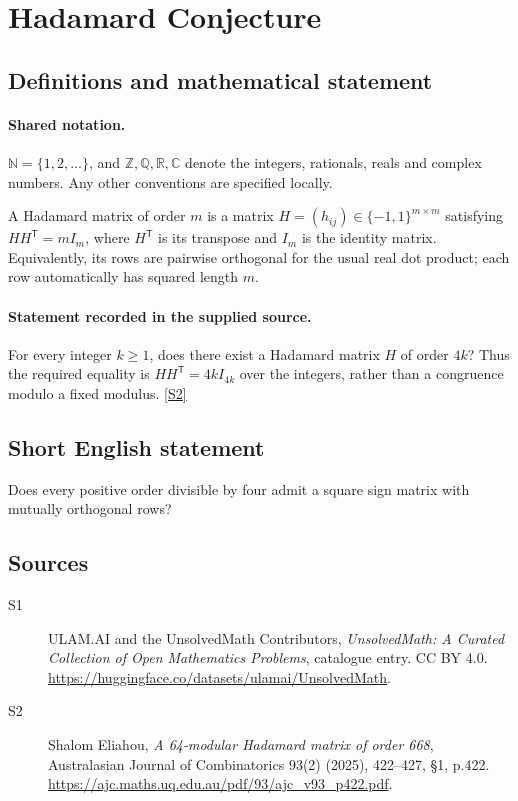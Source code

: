\documentclass[11pt]{article}
\newcommand{\sref}[2]{\hyperlink{source:#1:#2}{[S#2]}}
\begin{document}
\section{Hadamard Conjecture}\label{statement}

\subsection{Definitions and mathematical statement}

\paragraph{Shared notation.}$\mathbb N=\{1,2,\ldots\}$, and $\mathbb Z,\mathbb Q,\mathbb R,\mathbb C$ denote the integers, rationals, reals and complex numbers. Any other conventions are specified locally.


A Hadamard matrix of order $m$ is a matrix $H=(h_{ij})\in\{-1,1\}^{m\times m}$ satisfying $HH^{\mathsf T}=mI_m$, where $H^{\mathsf T}$ is its transpose and $I_m$ is the identity matrix. Equivalently, its rows are pairwise orthogonal for the usual real dot product; each row automatically has squared length $m$.
\paragraph{Statement recorded in the supplied source.}
For every integer $k\geq1$, does there exist a Hadamard matrix $H$ of order $4k$? Thus the required equality is $HH^{\mathsf T}=4kI_{4k}$ over the integers, rather than a congruence modulo a fixed modulus. \sref{statement}{2}
\subsection{Short English statement}
Does every positive order divisible by four admit a square sign matrix with mutually orthogonal rows?
\subsection{Sources}
\begin{description}
\item[\hypertarget{source:statement:1}{S1}] ULAM.AI and the UnsolvedMath Contributors, \emph{UnsolvedMath: A Curated Collection of Open Mathematics Problems}, catalogue entry. CC BY 4.0. \url{https://huggingface.co/datasets/ulamai/UnsolvedMath}.
\item[\hypertarget{source:statement:2}{S2}] Shalom Eliahou, \emph{A 64-modular Hadamard matrix of order 668}, Australasian Journal of Combinatorics 93(2) (2025), 422--427, §1, p.422. \url{https://ajc.maths.uq.edu.au/pdf/93/ajc_v93_p422.pdf}.
\end{description}
\label{end:statement}
\end{document}
